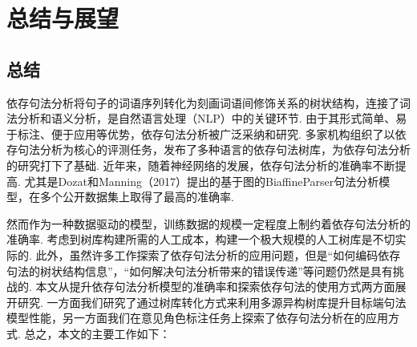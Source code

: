 
\chapter{总结与展望}

\section{总结}
依存句法分析将句子的词语序列转化为刻画词语间修饰关系的树状结构，连接了词法分析和语义分析，是自然语言处理（NLP）中的关键环节.
由于其形式简单、易于标注、便于应用等优势，依存句法分析被广泛采纳和研究. 多家机构组织了以依存句法分析为核心的评测任务，发布了多种语言的依存句法树库，为依存句法分析的研究打下了基础. 近年来，随着神经网络的发展，依存句法分析的准确率不断提高. 尤其是Dozat和Manning（2017）提出的基于图的BiaffineParser句法分析模型，在多个公开数据集上取得了最高的准确率.

然而作为一种数据驱动的模型，训练数据的规模一定程度上制约着依存句法分析的准确率. 考虑到树库构建所需的人工成本，构建一个极大规模的人工树库是不切实际的.
此外，虽然许多工作探索了依存句法分析的应用问题，但是“如何编码依存句法的树状结构信息”，“如何解决句法分析带来的错误传递”等问题仍然是具有挑战的.
本文从提升依存句法分析模型的准确率和探索依存句法的使用方式两方面展开研究. 一方面我们研究了通过树库转化方式来利用多源异构树库提升目标端句法模型性能，另一方面我们在意见角色标注任务上探索了依存句法分析在的应用方式. 总之，本文的主要工作如下：

